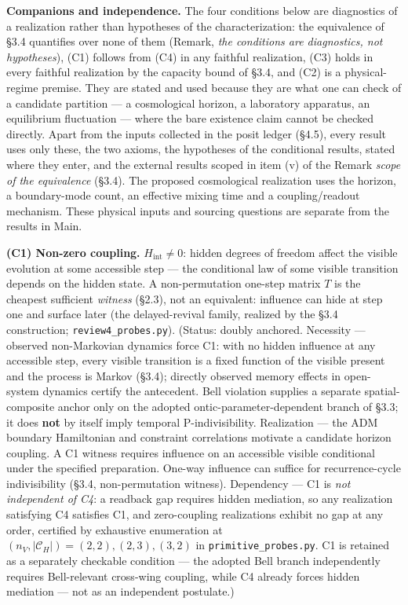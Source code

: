\documentclass[
]{article}
\begin{document}
\textbf{Companions and independence.} The four conditions below are
diagnostics of a realization rather than hypotheses of the
characterization: the equivalence of §3.4 quantifies over none of them
(Remark, \emph{the conditions are diagnostics, not hypotheses}), (C1)
follows from (C4) in any faithful realization, (C3) holds in every
faithful realization by the capacity bound of §3.4, and (C2) is a
physical-regime premise. They are stated and used because they are what
one can check of a candidate partition --- a cosmological horizon, a
laboratory apparatus, an equilibrium fluctuation --- where the bare
existence claim cannot be checked directly. Apart from the inputs
collected in the posit ledger (§4.5), every result uses only these, the
two axioms, the hypotheses of the conditional results, stated where they
enter, and the external results scoped in item (v) of the Remark
\emph{scope of the equivalence} (§3.4). The proposed cosmological
realization uses the horizon, a boundary-mode count, an effective mixing
time and a coupling/readout mechanism. These physical inputs and
sourcing questions are separate from the results in Main.

\textbf{(C1) Non-zero coupling.} \(H_{\text{int}} \neq 0\): hidden
degrees of freedom affect the visible evolution at some accessible step
--- the conditional law of some visible transition depends on the hidden
state. A non-permutation one-step matrix \(T\) is the cheapest
sufficient \emph{witness} (§2.3), not an equivalent: influence can hide
at step one and surface later (the delayed-revival family, realized by
the §3.4 construction; \texttt{review4\_probes.py}). (Status: doubly
anchored. Necessity --- observed non-Markovian dynamics force C1: with
no hidden influence at any accessible step, every visible transition is
a fixed function of the visible present and the process is Markov
(§3.4); directly observed memory effects in open-system dynamics certify
the antecedent. Bell violation supplies a separate spatial-composite
anchor only on the adopted ontic-parameter-dependent branch of §3.3; it
does \textbf{not} by itself imply temporal P-indivisibility. Realization
--- the ADM boundary Hamiltonian and constraint correlations motivate a
candidate horizon coupling. A C1 witness requires influence on an
accessible visible conditional under the specified preparation. One-way
influence can suffice for recurrence-cycle indivisibility (§3.4,
non-permutation witness). Dependency --- C1 is \emph{not independent of
C4}: a readback gap requires hidden mediation, so any realization
satisfying C4 satisfies C1, and zero-coupling realizations exhibit no
gap at any order, certified by exhaustive enumeration at
\((n_V, |\mathcal{C}_H|) = (2,2), (2,3), (3,2)\) in
\texttt{primitive\_probes.py}. C1 is retained as a separately checkable
condition --- the adopted Bell branch independently requires
Bell-relevant cross-wing coupling, while C4 already forces hidden
mediation --- not as an independent postulate.)
\end{document}
